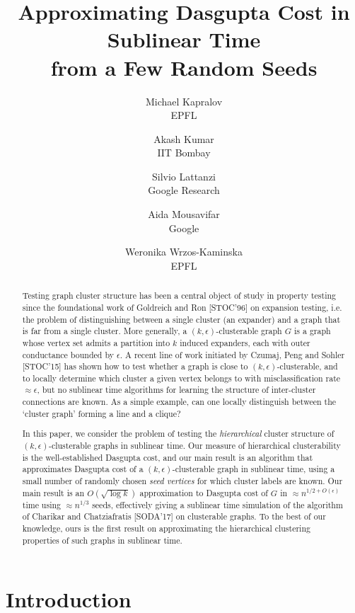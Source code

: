 \documentclass[letterpaper,11pt]{article}
\title{Approximating Dasgupta Cost in Sublinear Time\\ from a Few Random Seeds}
\author{Michael Kapralov\\EPFL \and
Akash Kumar\\IIT Bombay \and 
Silvio Lattanzi\\Google Research \and
Aida Mousavifar \\Google \and 
Weronika Wrzos-Kaminska \\EPFL}
\date{}
\theoremstyle{plain}
\theoremstyle{definition}
\theoremstyle{remark}
\newcommand{\e}{\epsilon}
\begin{document}
\maketitle


\begin{abstract}
 Testing graph cluster structure has been a central object of study in property testing since the foundational work of Goldreich and Ron [STOC'96] on expansion testing, i.e. the problem of distinguishing between a single cluster (an expander) and a graph that is far from a single cluster. 
 More generally, a $(k, \e)$-clusterable graph $G$ is a graph whose vertex set admits a partition into $k$ induced expanders, each with outer conductance bounded by $\e$.  A recent line of work initiated by Czumaj, Peng and Sohler [STOC'15] has shown how to test whether a graph is close to $(k, 
\e)$-clusterable, and to locally determine which cluster a given vertex belongs to with misclassification rate $\approx \e$, but no sublinear time algorithms for learning the structure of inter-cluster connections are known. As a simple example, can one locally distinguish between the `cluster graph' forming a line and a clique? 

 In this paper, we consider the problem of testing the {\em hierarchical} cluster structure of $(k, \e)$-clusterable graphs in sublinear time. Our measure of hierarchical clusterability is the well-established Dasgupta cost, and our main result is an algorithm that approximates Dasgupta cost of a $(k, \e)$-clusterable graph in sublinear time, using a small number of randomly chosen {\em seed vertices} for which cluster labels are known. Our main result is an $O(\sqrt{\log k})$ approximation to Dasgupta cost of $G$ in  $\approx n^{1/2+O(\e)}$ time using $\approx n^{1/3}$ seeds, effectively giving a sublinear time simulation of the algorithm of Charikar and Chatziafratis [SODA'17] on clusterable graphs. To the best of our knowledge, ours is the first result on approximating the hierarchical clustering properties of such graphs in sublinear time.
 
\end{abstract}



 \vspace{-10pt}
\section{Introduction}
\label{sec:intro}
\end{document}
